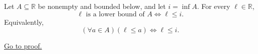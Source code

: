 \begin{proposition}
\label{prop:lower-bound-comparison-with-the-infimum}
Let $A\subseteq\mathbb{R}$ be nonempty and bounded below, and let
$i=\inf A$. For every $\ell\in\mathbb{R}$,
\[
  \ell\text{ is a lower bound of }A
  \Longleftrightarrow
  \ell\leq i.
\]
Equivalently,
\[
  (\forall a\in A)(\ell\leq a)
  \Longleftrightarrow
  \ell\leq i.
\]

\hyperref[prf:lower-bound-comparison-with-the-infimum]{Go to proof.}
\end{proposition}